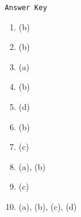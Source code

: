\begin{center}
\texttt{Answer Key}
\begin{multicols}{5}
\begin{enumerate}
\item (b)
\item (b)
\item (a)
\item (b)
\item (d)
\item (b)
\item (c)
\item (a), (b)
\item (c)
\item (a), (b), (c), (d)
\end{enumerate}
\end{multicols}
\end{center}
